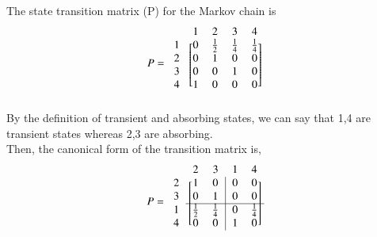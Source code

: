 \documentclass[journal,12pt,twocolumn]{IEEEtran}
\begin{document}
The state transition matrix (P) for the Markov chain is
\begin{align}
\label{1}
    P=\begin{blockarray}{ccccc}
& 1 & 2 & 3 & 4 \\
\begin{block}{c[cccc]}
  1 & 0 & \frac{1}{2} & \frac{1}{4}  & \frac{1}{4}  \\
  2 & 0 & 1 & 0 & 0 \\
  3 & 0 & 0 & 1 & 0 \\
  4 & 1 & 0 & 0 & 0 \\
\end{block}
\end{blockarray}
\end{align}
By the definition of transient and absorbing states, we can say that 1,4 are transient states whereas 2,3 are absorbing.\\
Then, the canonical form of the transition matrix is,
\begin{align}
\label{2}
    P=\begin{blockarray}{ccccc}
& 2 & 3 & 1 & 4 \\
\begin{block}{c[cc|cc]}
  2 & 1 & 0 & 0 & 0  \\
  3 & 0 & 1 & 0 & 0 \\ 
  \cline{2-5}
  1 & \frac{1}{2} & \frac{1}{4} & 0 & \frac{1}{4} \\
  4 & 0 & 0 & 1 & 0 \\
\end{block}
\end{blockarray}
\end{align}
\end{document}

